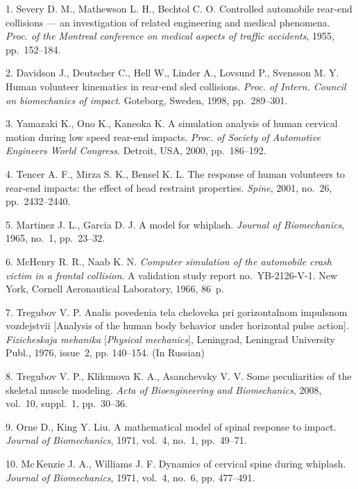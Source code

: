 


{\footnotesize

\vskip 4mm


\vskip 3mm

1. Severy D. M., Mathewson L. H., Bechtol C. O. Controlled
automobile rear-end collisions --- an investigation of related
engineering and medical phenomena. {\it Proc. of the Montreal
conference on medical aspects of traffic accidents}, 1955,
pp.~152--184.

2.   Davidson  J., Deutscher C., Hell W., Linder A., Lovsund P.,
Svensson M. Y. Human volunteer kinematics in rear-end sled
collisions. {\it Proc. of Intern. Council on biomechanics of
impact}. Goteborg, Sweden, 1998, pp.~289--301.

3.    Yamazaki K., Ono K., Kaneoka K. A simulation analysis of
human cervical motion during low speed rear-end impacts. {\it
Proc. of Society of Automotive Engineers World Congress}. Detroit,
USA, 2000, pp.~186--192.

4.    Tencer A. F., Mirza S. K., Bensel K. L. The response of
human volunteers to rear-end impacts: the effect of head restraint
properties. {\it Spine}, 2001, no.~26, pp.~2432--2440.

5.    Martinez J. L., Garcia D. J. A model for whiplash. {\it
Journal of Biomechanics}, 1965, no.~1, pp.~23--32.

6.    McHenry R. R., Naab K. N. {\it Computer simulation of the
automobile crash victim in a frontal collision}. A validation
study report no.~YB-2126-V-1. New York, Cornell Aeronautical
Laboratory, 1966, 86~p.

7.   Tregubov V. P. Analis povedenia tela cheloveka pri
gorizontalnom impulsnom vozdejstvii [Analysis of the human body
behavior under horizontal pulse action]. {\it Fizicheskaja
mehanika} [{\it Physical mechanics}], Leningrad, Leningrad
University Publ., 1976, issue~2, pp. 140--154. (In Russian)

8.   Tregubov V. P., Klikunova K. A., Asanchevsky V. V. Some
peculiarities of the skeletal muscle modeling. {\it Acta of
Bioengineering and Biomechanics}, 2008, vol.~10, suppl.~1,
pp.~30--36.

9.   Orne D., King Y. Liu. A mathematical model of spinal response
to impact. {\it Journal of Biomechanics}, 1971, vol.~4, no.~1,
pp.~49--71.

10.  Mc\,Kenzie J. A., Williams J. F. Dynamics of cervical spine
during whiplash. {\it Journal of Biomechanics},  1971, vol.~4,
no.~6, pp. 477--491.

}
